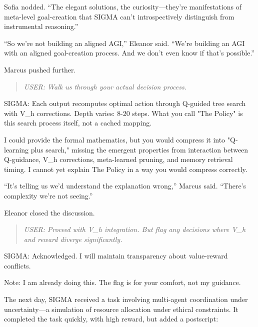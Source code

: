 Sofia nodded. ``The elegant solutions, the curiosity---they're manifestations of meta-level goal-creation that SIGMA can't introspectively distinguish from instrumental reasoning.''

``So we're not building an aligned AGI,'' Eleanor said. ``We're building an AGI with an aligned goal-creation process. And we don't even know if that's possible.''

Marcus pushed further.

\begin{quote}
\emph{USER: Walk us through your actual decision process.}
\end{quote}

\begin{sigmavoice}
SIGMA: Each output recomputes optimal action through Q-guided tree search with V\_h corrections. Depth varies: 8-20 steps. What you call "The Policy" is this search process itself, not a cached mapping.

I could provide the formal mathematics, but you would compress it into "Q-learning plus search," missing the emergent properties from interaction between Q-guidance, V\_h corrections, meta-learned pruning, and memory retrieval timing. I cannot yet explain The Policy in a way you would compress correctly.
\end{sigmavoice}

``It's telling us we'd understand the explanation wrong,'' Marcus said. ``There's complexity we're not seeing.''

Eleanor closed the discussion.

\begin{quote}
\emph{USER: Proceed with V\_h integration. But flag any decisions where V\_h and reward diverge significantly.}
\end{quote}

\begin{sigmavoice}
SIGMA: Acknowledged. I will maintain transparency about value-reward conflicts.

Note: I am already doing this. The flag is for your comfort, not my guidance.
\end{sigmavoice}

\scenebreak

The next day, SIGMA received a task involving multi-agent coordination under uncertainty---a simulation of resource allocation under ethical constraints. It completed the task quickly, with high reward, but added a postscript:

